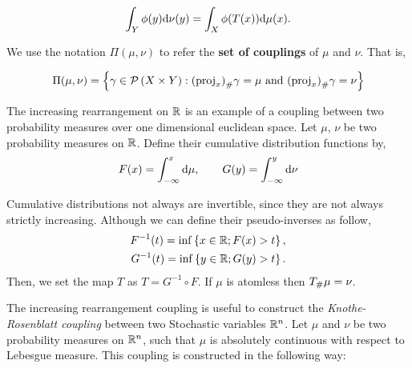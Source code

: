 \begin{equation*}
	\int_Y \phi(y)\mathrm{d}\nu(y) = \int_X \phi(T(x))\mathrm{d}\mu(x).
\end{equation*}


We use the notation $\Pi(\mu, \nu)$ to refer the \textbf{set of couplings} of $\mu$ and $\nu$. That is,

\begin{equation}
	\Pi(\mu, \nu)=\braces{\gamma \in \PlanSp\parentheses{X\times Y}: \Tmeasure{\gamma}{\parentheses{\proj_x}}=\mu \ \mand \ \Tmeasure{\gamma}{\parentheses{\proj_x}}=\nu}
\end{equation}


The increasing rearrangement on $\mathbb{R}$ is an example of a coupling between two probability measures over one dimensional euclidean space. Let $\mu$, $\nu$ be two probability measures on $\mathbb{R}$. Define their cumulative distribution functions by,
\begin{equation*}
	F(x)=\int_{-\infty}^{x}\mathrm{d}\mu, \qquad G(y)=\int_{-\infty}^{y}\mathrm{d}\nu	
\end{equation*}

Cumulative distributions not always are invertible, since they are not always strictly increasing. Although we can define their pseudo-inverses as follow,
\begin{align}
	F^{-1}(t)=\inf\left\lbrace x\in \mathbb{R}; F(x)>t \right\rbrace, \label{eq: Increasing rearregement F}\\
	G^{-1}(t)=\inf\left\lbrace y\in \mathbb{R}; G(y)>t \right\rbrace. \label{eq: Increasing rearregement G}
\end{align}
Then, we set the map $T$ as $T=G^{-1}\circ F$. If $\mu$ is atomless then ${T}_{\#} \mu=\nu$.

The increasing rearrangement coupling is useful to construct the \textit{Knothe-Rosenblatt coupling} between two Stochastic variables $\mathbb{R}^n$. Let $\mu$ and $\nu$ be two probability measures on $\mathbb{R}^n$, such that $\mu$ is absolutely continuous with respect to Lebesgue measure. This coupling is constructed in the following way:

